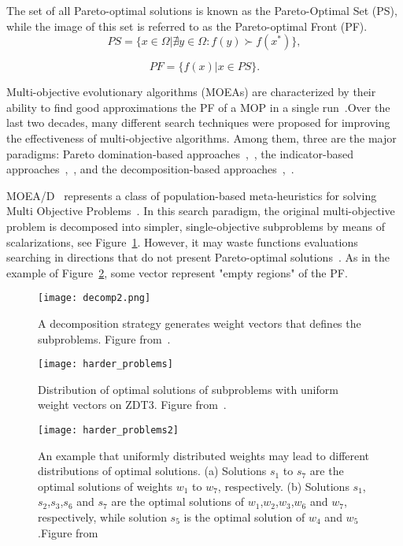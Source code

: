 \documentclass{IEEEtran}
\begin{document}
The set of all Pareto-optimal solutions is known as the Pareto-Optimal Set (PS), while the image of this set is referred to as the Pareto-optimal Front (PF).\\

\begin{equation}
PS = \{x \in \Omega | \nexists y \in \Omega : f(y) \succ f(x^*)  \},
\end{equation}

\begin{equation}
PF = \{f(x) | x \in PS \}.
\end{equation}

Multi-objective evolutionary algorithms (MOEAs) are characterized by their ability to find good approximations the PF of a MOP in a single run~\cite{zhou2011multiobjective}.Over the last two decades, many different search techniques were proposed for improving the effectiveness of multi-objective algorithms. Among them, three are the major paradigms: Pareto domination-based approaches~\cite{deb2002fast},~\cite{zitzler2001spea2}, the indicator-based approaches~\cite{beume2007sms},~\cite{zitzler2004indicator}, and the decomposition-based approaches~\cite{li2009multiobjective},~\cite{zhang2007moea}. 


MOEA/D~\cite{zhang2007moea} represents a class of population-based meta-heuristics for solving Multi Objective Problems~\cite{trivedi2017survey}. In this search paradigm, the original multi-objective problem is decomposed into simpler, single-objective subproblems by means of scalarizations, see Figure~\ref{fig1}.
However, it may waste functions evaluations searching in directions that do not present Pareto-optimal solutions~\cite{bezerra2015comparing}. As in the example of Figure~\ref{fig2}, some vector represent "empty regions" of the PF.
\begin{figure}[h]
	\centering
	\texttt{[image: decomp2.png]}
	\caption{A decomposition strategy generates weight vectors that defines the subproblems. Figure from~\cite{chugh2017handling}.}
	\label{fig1}
\end{figure}

\begin{figure}[h]
	\centering
	\texttt{[image: harder\_problems]}
	\caption{Distribution of optimal solutions of subproblems with uniform weight vectors on ZDT3. Figure from~\cite{li2015use}.}
	\label{fig2}
\end{figure}


\begin{figure}[h]
	\centering
	\texttt{[image: harder\_problems2]}
	\caption{An example that uniformly distributed weights may lead to different distributions of optimal solutions. (a) Solutions $s_1$ to $s_7$ are the optimal solutions of weights $w_1$ to $w_7$, respectively. (b) Solutions $s_1$,$s_2$,$s_3$,$s_6$ and $s_7$ are the optimal solutions of $w_1$,$w_2$,$w_3$,$w_6$ and $w_7$, respectively, while solution $s_5$ is the optimal solution of $w_4$ and $w_5$.Figure from~\cite{li2017weights}}
	\label{fig3}
\end{figure}
\end{document}

